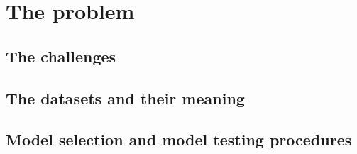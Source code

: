 \chapter{The problem}
\label{chp:problem}
\section{The challenges}
\section{The datasets and their meaning}
\section{Model selection and model testing procedures}
